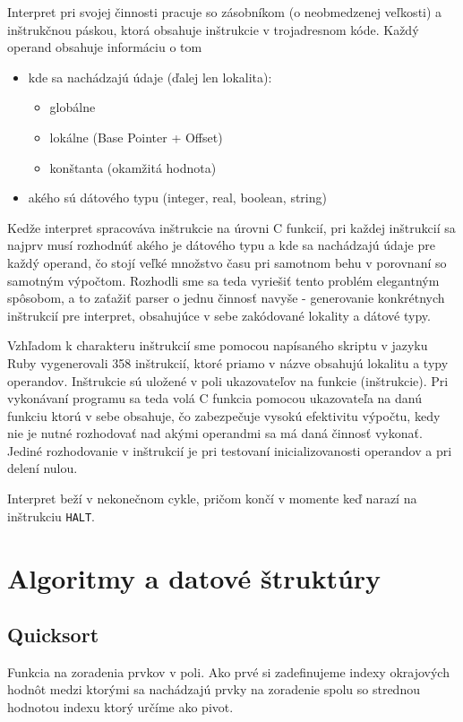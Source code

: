 \documentclass[12pt,a4paper,titlepage,final]{article}
\begin{document}
Interpret pri svojej činnosti pracuje so zásobníkom (o neobmedzenej veľkosti) a
inštrukčnou páskou, ktorá obsahuje inštrukcie v trojadresnom kóde.
Každý operand obsahuje informáciu o tom 
\begin{itemize}
	\item kde sa nachádzajú údaje (ďalej len lokalita):
		\begin{itemize}
			\item globálne
			\item lokálne (Base Pointer + Offset)
			\item konštanta (okamžitá hodnota)
		\end{itemize}
	\item akého sú dátového typu (integer, real, boolean, string)
\end{itemize}

Kedže interpret spracováva inštrukcie na úrovni C funkcií, pri každej inštrukcií
 sa najprv musí rozhodnúť akého je dátového typu a kde sa nachádzajú údaje pre 
 každý operand, čo stojí veľké množstvo času pri samotnom behu v porovnaní 
 so samotným výpočtom.
Rozhodli sme sa teda vyriešiť tento problém elegantným spôsobom, 
 a to zaťažiť parser o jednu činnosť navyše - generovanie konkrétnych 
 inštrukcií pre interpret, obsahujúce v sebe zakódované lokality a dátové typy.

Vzhľadom k charakteru inštrukcií sme pomocou napísaného skriptu v jazyku Ruby
 vygenerovali 358 inštrukcií, 
 ktoré priamo v názve obsahujú lokalitu a typy operandov.
Inštrukcie sú uložené v poli ukazovateľov na funkcie (inštrukcie).
 Pri vykonávaní programu sa teda volá C funkcia pomocou ukazovateľa na danú 
 funkciu ktorú v sebe obsahuje, čo zabezpečuje vysokú efektivitu výpočtu,
 kedy nie je nutné rozhodovať nad akými operandmi sa má daná činnosť vykonať.
 Jediné rozhodovanie v inštrukcií je pri testovaní inicializovanosti operandov a pri delení nulou.

Interpret beží v nekonečnom cykle, pričom končí v momente keď narazí na inštrukciu
\texttt{HALT}.

\section{Algoritmy a datové štruktúry}
\subsection{Quicksort}
Funkcia na zoradenia prvkov v poli. Ako prvé si zadefinujeme indexy okrajových
hodnôt medzi ktorými sa nachádzajú prvky na zoradenie spolu so strednou hodnotou
indexu ktorý určíme ako pivot.
\end{document}
